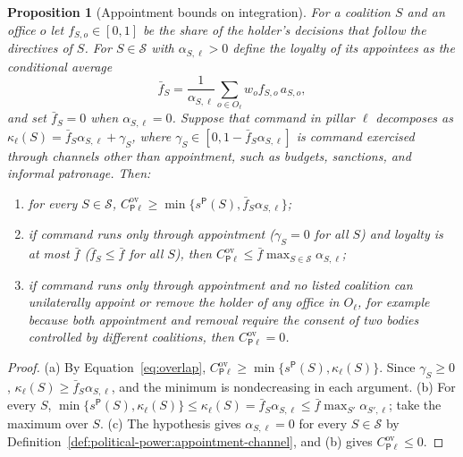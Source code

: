 \documentclass[11pt,letterpaper]{article}
\newtheorem{proposition}[theorem]{Proposition}
\theoremstyle{definition}
\theoremstyle{remark}
\newcommand{\pP}{\mathsf{P}}
\begin{document}
\begin{proposition}[Appointment bounds on integration]
\label{prop:political-power:appointment-bound}
For a coalition $S$ and an office $o$ let $f_{S,o}\in[0,1]$ be the share of the holder's decisions that follow the directives of $S$. For $S\in\mathcal{S}$ with $\alpha_{S,\ell}>0$ define the loyalty of its appointees as the conditional average
\[
\bar f_S=\frac{1}{\alpha_{S,\ell}}\sum_{o\in O_\ell}w_o f_{S,o}\,a_{S,o},
\]
and set $\bar f_S=0$ when $\alpha_{S,\ell}=0$. Suppose that command in pillar $\ell$ decomposes as $\kappa_\ell(S)=\bar f_S\alpha_{S,\ell}+\gamma_S$, where $\gamma_S\in[0,1-\bar f_S\alpha_{S,\ell}]$ is command exercised through channels other than appointment, such as budgets, sanctions, and informal patronage. Then:
\begin{enumerate}[label=(\alph*)]
\item for every $S\in\mathcal{S}$, $C^{\mathrm{ov}}_{\pP\ell}\ge\min\{s^{\pP}(S),\bar f_S\alpha_{S,\ell}\}$;
\item if command runs only through appointment ($\gamma_S=0$ for all $S$) and loyalty is at most $\bar f$ ($\bar f_S\le\bar f$ for all $S$), then $C^{\mathrm{ov}}_{\pP\ell}\le\bar f\max_{S\in\mathcal{S}}\alpha_{S,\ell}$;
\item if command runs only through appointment and no listed coalition can unilaterally appoint or remove the holder of any office in $O_\ell$, for example because both appointment and removal require the consent of two bodies controlled by different coalitions, then $C^{\mathrm{ov}}_{\pP\ell}=0$.
\end{enumerate}
\end{proposition}

\begin{proof}
(a) By Equation~\eqref{eq:overlap}, $C^{\mathrm{ov}}_{\pP\ell}\ge\min\{s^{\pP}(S),\kappa_\ell(S)\}$. Since $\gamma_S\ge0$, $\kappa_\ell(S)\ge\bar f_S\alpha_{S,\ell}$, and the minimum is nondecreasing in each argument. (b) For every $S$, $\min\{s^{\pP}(S),\kappa_\ell(S)\}\le\kappa_\ell(S)=\bar f_S\alpha_{S,\ell}\le\bar f\max_{S'}\alpha_{S',\ell}$; take the maximum over $S$. (c) The hypothesis gives $\alpha_{S,\ell}=0$ for every $S\in\mathcal{S}$ by Definition~\ref{def:political-power:appointment-channel}, and (b) gives $C^{\mathrm{ov}}_{\pP\ell}\le0$.
\end{proof}
\end{document}
